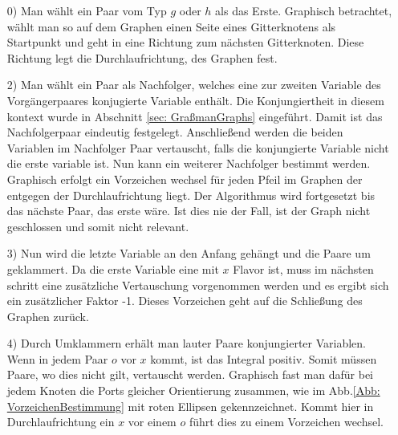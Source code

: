 \begin{itemize}
\item[0)] Man wählt ein Paar vom Typ $g$ oder $h$ als das Erste. Graphisch betrachtet, wählt man so auf dem Graphen einen Seite eines Gitterknotens als Startpunkt und geht in eine Richtung zum nächsten Gitterknoten. Diese Richtung legt die Durchlaufrichtung, des Graphen fest. 
\item[2)] Man wählt ein Paar als Nachfolger, welches eine zur zweiten Variable des Vorgängerpaares konjugierte Variable enthält. Die Konjungiertheit in diesem kontext wurde in Abschnitt \ref{sec: GraßmanGraphs} eingeführt. Damit ist das Nachfolgerpaar eindeutig festgelegt. Anschließend werden die beiden Variablen im Nachfolger Paar vertauscht, falls die konjungierte Variable nicht die erste variable ist. Nun kann ein weiterer Nachfolger bestimmt werden. Graphisch erfolgt ein Vorzeichen wechsel für jeden Pfeil im Graphen der entgegen der Durchlaufrichtung liegt.
Der Algorithmus wird fortgesetzt bis das nächste Paar, das erste wäre. Ist dies nie der Fall, ist der Graph nicht geschlossen und somit nicht relevant.
\item[3)] Nun wird die letzte Variable an den Anfang gehängt und die Paare um geklammert. Da die erste Variable eine mit $x$ Flavor ist, muss im nächsten schritt eine zusätzliche Vertauschung vorgenommen werden und es ergibt sich ein zusätzlicher Faktor -1. Dieses Vorzeichen geht auf die Schließung des Graphen zurück.
\item[4)] Durch Umklammern erhält man lauter Paare konjungierter Variablen. Wenn in jedem Paar $o$ vor $x$ kommt, ist das Integral positiv. Somit müssen Paare, wo dies nicht gilt, vertauscht werden. Graphisch fast man dafür bei jedem Knoten die Ports gleicher Orientierung zusammen, wie im Abb.\ref{Abb: VorzeichenBestimmung} mit roten Ellipsen gekennzeichnet.  Kommt hier in Durchlaufrichtung ein $x$ vor einem $o$ führt dies zu einem Vorzeichen wechsel.  
\end{itemize}


